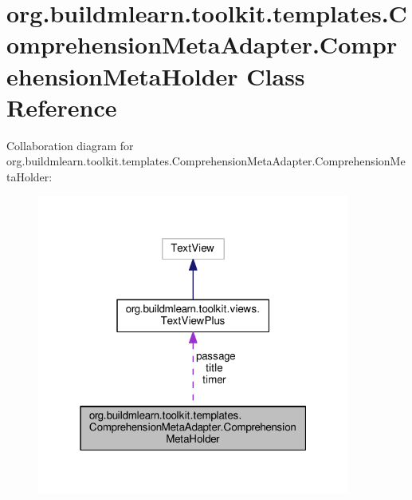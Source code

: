 \hypertarget{classorg_1_1buildmlearn_1_1toolkit_1_1templates_1_1ComprehensionMetaAdapter_1_1ComprehensionMetaHolder}{}\section{org.\+buildmlearn.\+toolkit.\+templates.\+Comprehension\+Meta\+Adapter.\+Comprehension\+Meta\+Holder Class Reference}
\label{classorg_1_1buildmlearn_1_1toolkit_1_1templates_1_1ComprehensionMetaAdapter_1_1ComprehensionMetaHolder}


Collaboration diagram for org.\+buildmlearn.\+toolkit.\+templates.\+Comprehension\+Meta\+Adapter.\+Comprehension\+Meta\+Holder\+:
\nopagebreak
\begin{figure}[H]
\begin{center}
\leavevmode
\includegraphics[width=292pt]{classorg_1_1buildmlearn_1_1toolkit_1_1templates_1_1ComprehensionMetaAdapter_1_1ComprehensionMetaHolder__coll__graph}
\end{center}
\end{figure}
